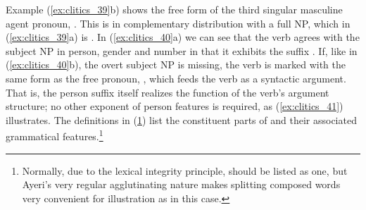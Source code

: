 Example (\ref{ex:clitics_39}b) shows the free form of the third singular
masculine agent pronoun, . This is in complementary
distribution with a full NP, which in (\ref{ex:clitics_39}a) is . In (\ref{ex:clitics_40}a) we can see that the verb agrees
with the subject NP in person, gender and number in that it exhibits the suffix
. If, like in (\ref{ex:clitics_40}b), the overt subject NP is
missing, the verb is marked with the same form as the free pronoun,
, which feeds the verb as a syntactic argument. That is,
the person suffix itself realizes the \Subj{} function of the verb's argument
structure; no other exponent of person features is required, as
(\ref{ex:clitics_41}) illustrates. The definitions in (\ref{ex:clitics_42})
list the constituent parts of  and their
associated grammatical features.\footnote{Normally, due to the lexical
integrity principle,  should be listed as one, but
Ayeri's very regular agglutinating nature makes splitting composed words very
convenient for illustration as in this case.}

\begin{figure}
\begin{morphlex}
\ex\label{ex:clitics_42}
\xe
\end{morphlex}
\end{figure}

